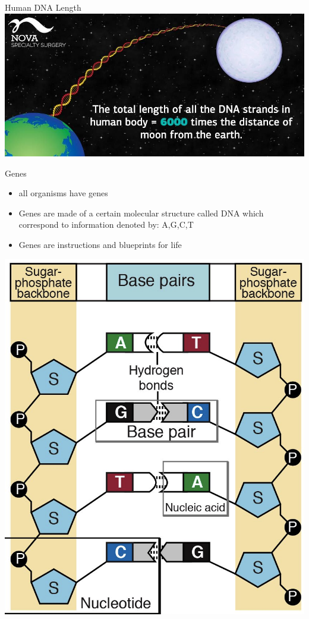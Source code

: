 \documentclass{beamer}
\begin{document}
\begin{frame}{Human DNA Length}
    \centering
    \includegraphics[scale=0.3]{dna-length.jpg}
\end{frame}

\begin{frame}{Genes}
  \begin{itemize}   
    \item all organisms have genes
    \item Genes are made of a certain molecular structure called DNA which correspond to information denoted by: A,G,C,T
    \item Genes are instructions and blueprints for life
  \end{itemize}
\centering
\includegraphics[scale=0.1]{gene-base-pair.png}
\end{frame}
\end{document}
